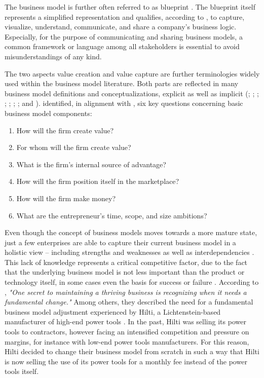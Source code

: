 The business model is further often referred to as blueprint . The blueprint itself represents a simplified representation and qualifies, according to \citet[pp. 11-14]{Osterwalder2005}, to capture, visualize, understand, communicate, and share a company's business logic. Especially, for the purpose of communicating and sharing business models, a common framework or language among all stakeholders is essential to avoid misunderstandings of any kind.

The two aspects value creation and value capture are further terminologies widely used within the business model literature. Both parts are reflected in many business model definitions and conceptualizations, explicit as well as implicit (\citealp[p. 511]{Amit2001}; \citealp[pp. 533-534]{Chesbrough2002}; \citealp[p. 727]{Morris2005}; \citealp[p. 202]{Shafer2005}; \citealp[p. 12]{Chesbrough2007}; \citealp[p. 52]{Johnson2008}; \citealp[p. 14]{Osterwalder2010}; and \citealp[pp. 1019-1020]{Zott2011}). \citet[pp. 729-732]{Morris2005} identified, in alignment with \citet[pp. 49-61]{Drucker1954}, six key questions concerning basic business model components:

\begin{enumerate}[parsep=0pt, topsep=0pt, itemsep=0pt]
	\item How will the firm create value?
	\item For whom will the firm create value?
	\item What is the firm's internal source of advantage?
	\item How will the firm position itself in the marketplace?
	\item How will the firm make money?
	\item What are the entrepreneur's time, scope, and size ambitions?
\end{enumerate}

Even though the concept of business models moves towards a more mature state, just a few enterprises are able to capture their current business model in a holistic view -- including strengths and weaknesses as well as interdependencies \citep[p. 52]{Johnson2008}. This lack of knowledge represents a critical competitive factor, due to the fact that the underlying business model is not less important than the product or technology itself, in some cases even the basis for success or failure . According to \citet[p. 50]{Johnson2008}, \textit{"One secret to maintaining a thriving business is recognizing when it needs a fundamental change."} Among others, they described the need for a fundamental business model adjustment experienced by Hilti, a Lichtenstein-based manufacturer of high-end power tools \citep[pp. 54-57]{Johnson2008}. In the past, Hilti was selling its power tools to contractors, however facing an intensified competition and pressure on margins, for instance with low-end power tools manufacturers. For this reason, Hilti decided to change their business model from scratch in such a way that Hilti is now selling the use of its power tools for a monthly fee instead of the power tools itself.

